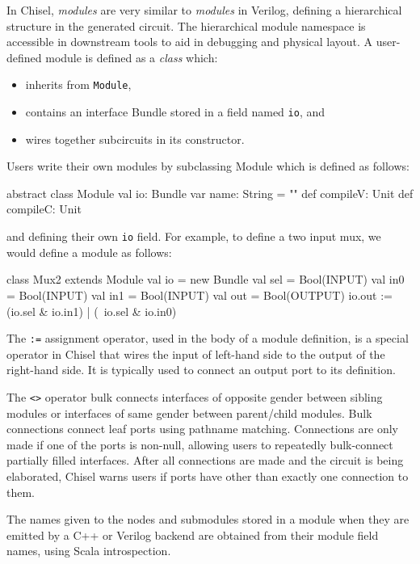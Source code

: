 \documentclass[10pt,twocolumn]{article}
\def\code#1{{\small\tt #1}}
\begin{document}
In Chisel, {\em modules} are very similar to {\em modules} in
Verilog, defining a hierarchical structure in the generated circuit.
The hierarchical module namespace is accessible in downstream tools
to aid in debugging and physical layout.  A user-defined module is
defined as a {\em class} which:
\begin{itemize}
\item inherits from \code{Module},
\item contains an interface Bundle stored in a field named \code{io}, and
\item wires together subcircuits in its constructor.
\end{itemize}

Users write their own modules by subclassing Module which is
defined as follows:

\begin{scala}
abstract class Module {
  val io: Bundle
  var name: String = ""
  def compileV: Unit
  def compileC: Unit
}
\end{scala}

\noindent
and defining their own \code{io} field.  For example, to define a two
input mux, we would define a module as follows:

\begin{scala}
class Mux2 extends Module {
  val io = new Bundle{
    val sel = Bool(INPUT)
    val in0 = Bool(INPUT)
    val in1 = Bool(INPUT)
    val out = Bool(OUTPUT)
  }
  io.out := (io.sel & io.in1) | (~io.sel & io.in0)
}
\end{scala}

\noindent
The \code{:=} assignment operator, used in the body of a
module definition, is a special operator in Chisel that wires the input of
left-hand side to the output of the right-hand side.  It is typically
used to connect an output port to its definition.

The \code{<>} operator bulk connects interfaces of opposite gender between
sibling modules or interfaces of same gender between parent/child modules. 
Bulk connections connect leaf ports using pathname matching.
Connections are only made if one of the ports is non-null,
allowing users to repeatedly bulk-connect partially filled interfaces.
After all connections are made and the circuit is being elaborated,
Chisel warns users if ports have other than exactly one connection to them.

The names given to the nodes and submodules stored in a module
when they are emitted by a C++ or Verilog backend are obtained from
their module field names, using Scala introspection.
\end{document}
